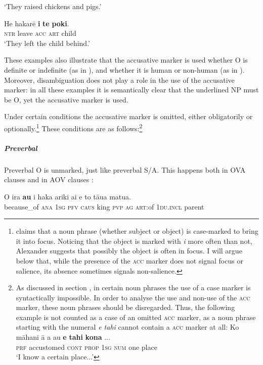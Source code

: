 {\glt 
‘They raised chickens and pigs.’ \textstyleExampleref{[R229.112]} 
\z

\ea\label{ex:8.27}
\gll He hakarē \textbf{i} \textbf{te} \textbf{poki}. \\
\textsc{ntr} leave \textsc{acc} \textsc{art} child \\

\glt
‘They left the child behind.’ \textstyleExampleref{[R532-07.057]}
\z

These examples also illustrate that the accusative marker is used whether O is definite or indefinite (as in ), and whether it is human or non-human (as in ). Moreover, disambiguation does not play a role in the use of the accusative marker: in all these examples it is semantically clear that the underlined NP must be O, yet the accusative marker is used.

Under certain conditions the accusative marker is omitted, either obligatorily or optionally.\footnote{\label{fn:404}\citet[165]{Alexander1981Minnesota} claims that a noun phrase (whether subject or object) is case-marked to bring it into focus. Noticing that the object is marked with \textit{i} more often than not, Alexander suggests that possibly the object is often in focus. I will argue below that, while the presence of the \textsc{acc} marker does not signal focus or salience, its absence sometimes signals non-salience.} These conditions are as follows:\footnote{\label{fn:405}As discussed in section , in certain noun phrases the use of a case marker is syntactically impossible. In order to analyse the use and non-use of the \textsc{acc} marker, these noun phrases should be disregarded. Thus, the following example is not counted as a case of an omitted \textsc{acc} marker, as a noun phrase starting with the numeral \textit{e tahi} cannot contain a \textsc{acc} marker at all:
\ea
\gll
Ko māhani {\ꞌ}ā a au \textbf{e} \textbf{tahi} \textbf{kona} ...\\
  \textsc{prf} accustomed \textsc{cont} \textsc{prop} \textsc{1sg} \textsc{num} one place\\
  \glt 
  ‘I know a certain place...’ \textstyleExampleref{[R296.001]}\z }} 
\subparagraph{Preverbal} Preverbal O is unmarked, just like preverbal S/A. This happens both in OVA clauses  and in AOV clauses :

\ea\label{ex:8.28}
\gll {\ꞌ}O ira \textbf{au} i haka {\ꞌ}ariki ai e to tāua matu{\ꞌ}a.\\
because\_of \textsc{ana} \textsc{1sg} \textsc{pfv} \textsc{caus} king \textsc{pvp} \textsc{ag} \textsc{art}:of \textsc{1du.incl} parent\\

